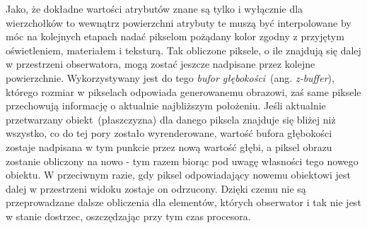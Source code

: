Jako, że dokładne wartości atrybutów znane są tylko i wyłącznie dla wierzchołków to wewnątrz powierzchni atrybuty te muszą być interpolowane by móc na kolejnych etapach nadać pikselom pożądany kolor zgodny z przyjętym oświetleniem, materiałem i teksturą. Tak obliczone piksele, o ile znajdują się dalej w przestrzeni obserwatora, mogą zostać jeszcze nadpisane przez kolejne powierzchnie. Wykorzystywany jest do tego \textit{bufor głębokości}~(ang. \textit{z-buffer}), którego rozmiar w pikselach odpowiada generowanemu obrazowi, zaś same piksele przechowują informację o aktualnie najbliższym położeniu. Jeśli aktualnie przetwarzany obiekt~(płaszczyzna) dla danego piksela znajduje się bliżej niż wszystko, co do tej pory zostało wyrenderowane, wartość bufora głębokości zostaje nadpisana w tym punkcie przez nową wartość głębi, a piksel obrazu zostanie obliczony na nowo - tym razem biorąc pod uwagę własności tego nowego obiektu. W przeciwnym razie, gdy piksel odpowiadający nowemu obiektowi jest dalej w przestrzeni widoku zostaje on odrzucony. Dzięki czemu nie są przeprowadzane dalsze obliczenia dla elementów, których obserwator i tak nie jest w stanie dostrzec, oszczędzając przy tym czas procesora.


